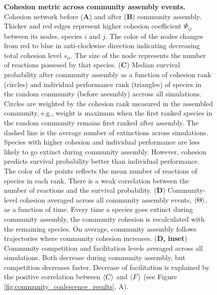 \documentclass[titlepage,11pt]{article}
\begin{document}
\begin{linenumbers}
\begin{singlespace}
\begin{figure}
			\caption{\textbf{Cohesion metric across community assembly events.} Cohesion network before (\textbf{A}) and after (\textbf{B}) community assembly. Thicker and red edges represent higher  cohesion coefficient $ \Psi_{ij} $ between its nodes, species $ i \text{ and } j $. The color of the nodes changes from red to blue in anti-clockwise direction indicating decreasing total cohesion level $ s_{\alpha} $. The size of the node represents the number of reactions possesed by that species. (\textbf{C}) Median survival probability after community assembly as a function of cohesion rank (circles) and individual performance rank (triangles) of species in the random community (before asesmbly) accross all simulations. Circles are weighted by the cohesion rank measured in the assembled community, e.g., weight is maximum when the first ranked species in the random community remains first ranked after assembly. The dashed line is the average number of extinctions across simulations. Species with higher cohesion and individual performance are less likely to go extinct during community assembly. However, cohesion predicts survival probability better than individual performance. The color of the points reflects the mean number of reactions of species in each rank. There is a weak correlation between the number of reactions and the survival probability. (\textbf{D})  Community-level cohesion averaged across all community assembly events,  $\braket{\Theta} $, as a function of time. Every time a species goes extinct during community assembly, the community cohesion is recalculated with the remaining species. On average, community assembly follows trajectories where community cohesion increases. (\textbf{D, inset}) Community competition and facilitation levels averaged across all simulations. Both decrease during community assembly, but competition decreases faster. Decrease of facilitation is explained by the positive correlation between $ \braket{C} $ and $ \braket{F} $ (see Figure \ref{fig:community_coalescence_results}, A).}
			\label{fig:interaction_evolution}
		\end{figure}

\end{singlespace}
\end{linenumbers}
\end{document}
